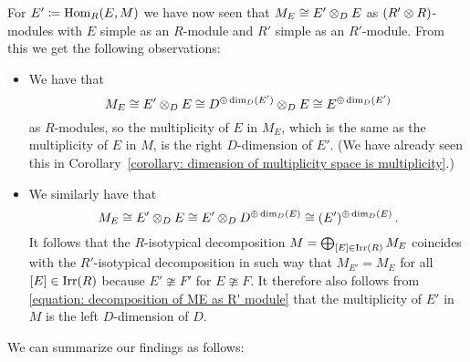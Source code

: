 

\begin{fluff}
  For $E' \coloneqq \operatorname{Hom}_R(E,M)$ we have now seen that $M_E \cong E' \mathbin{\otimes}_D E$ as $(R' \mathbin{\otimes} R)$-modules with $E$ simple as an $R$-module and $R'$ simple as an $R'$-module.
  From this we get the following observations:
  \begin{itemize}
    \item
      We have that
      \[
              M_E
        \cong E' \mathbin{\otimes}_D E
        \cong D^{\oplus \dim_D(E')} \mathbin{\otimes}_D E
        \cong E^{\oplus \dim_D(E')}
      \]
      as $R$-modules, so the multiplicity of $E$ in $M_E$, which is the same as the multiplicity of $E$ in $M$, is the right $D$-dimension of $E'$.
      (We have already seen this in Corollary~\ref{corollary: dimension of multiplicity space is multiplicity}.)
    \item
      We similarly have that
      \begin{equation}
        \label{equation: decomposition of ME as R' module}
              M_E
        \cong E' \mathbin{\otimes}_D E
        \cong E' \mathbin{\otimes}_D D^{\oplus \dim_D(E)}
        \cong (E')^{\oplus \dim_D(E)} \,.
      \end{equation}
      It follows that the $R$-isotypical decomposition $M = \bigoplus_{[E] \in \operatorname{Irr}(R)} M_E$ coincides with the $R'$-isotypical decomposition in such way that $M_{E'} = M_E$ for all $[E] \in \operatorname{Irr}(R)$ because $E' \ncong F'$ for $E \ncong F$.
      It therefore also follows from \eqref{equation: decomposition of ME as R' module} that the multiplicity of $E'$ in $M$ is the left $D$-dimension of $D$.
  \end{itemize}
  We can summarize our findings as follows:
\end{fluff}


